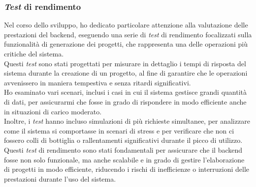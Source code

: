 \subsubsection{\textit{Test} di rendimento}  

Nel corso dello sviluppo, ho dedicato particolare attenzione alla valutazione delle prestazioni del \gls{backend}, eseguendo una serie di \textit{test} di rendimento focalizzati sulla funzionalità di generazione dei progetti, che rappresenta una delle operazioni più critiche del sistema. \\

\noindent Questi \textit{test} sono stati progettati per misurare in dettaglio i tempi di risposta del sistema durante la creazione di un progetto, al fine di garantire che le operazioni avvenissero in maniera tempestiva e senza ritardi significativi. \\
Ho esaminato vari scenari, inclusi i casi in cui il sistema gestisce grandi quantità di dati, per assicurarmi che fosse in grado di rispondere in modo efficiente anche in situazioni di carico moderato.\\

\noindent Inoltre, i \textit{test} hanno incluso simulazioni di più richieste simultanee, per analizzare come il sistema si comportasse in scenari di stress e per verificare che non ci fossero colli di bottiglia o rallentamenti significativi durante il picco di utilizzo. \\

\noindent Questi \textit{test} di rendimento sono stati fondamentali per assicurare che il \gls{backend} fosse non solo funzionale, ma anche scalabile e in grado di gestire l'elaborazione di progetti in modo efficiente, riducendo i rischi di inefficienze o interruzioni delle prestazioni durante l'uso del sistema.
